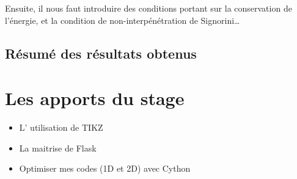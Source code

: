 Ensuite, il nous faut introduire des conditions portant sur la conservation de l'énergie, et la condition de non-interpénétration de Signorini\dots






\subsection{Résumé des résultats obtenus}





















\section{Les apports du stage}

\begin{itemize}
   \item L' utilisation de TIKZ
   \item La maitrise de Flask
\end{itemize}

\begin{itemize}
    \item Optimiser mes codes (1D et 2D) avec Cython
\end{itemize}